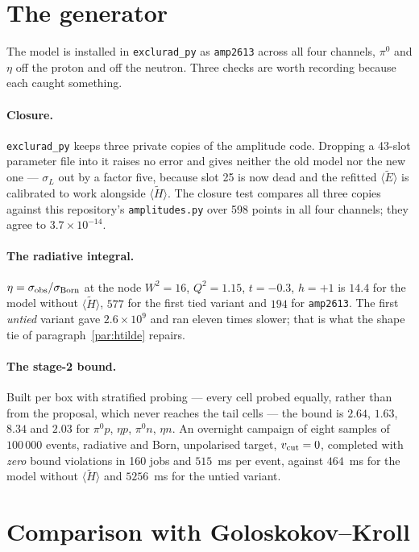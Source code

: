 \documentclass[11pt,a4paper]{article}
\newcommand{\sig}[1]{\sigma_{#1}}
\begin{document}
\section{The generator}

The model is installed in \texttt{exclurad\_py} as \texttt{amp2613} across all
four channels, $\pi^0$ and $\eta$ off the proton and off the neutron.  Three
checks are worth recording because each caught something.

\paragraph{Closure.}  \texttt{exclurad\_py} keeps three private copies of the
amplitude code.  Dropping a 43-slot parameter file into it raises no error and
gives neither the old model nor the new one --- $\sig{L}$ out by a factor five,
because slot 25 is now dead and the refitted $\langle\tilde E\rangle$ is
calibrated to work alongside $\langle\tilde H\rangle$.  The closure test
compares all three copies against this repository's \texttt{amplitudes.py} over
598 points in all four channels; they agree to $3.7\times10^{-14}$.

\paragraph{The radiative integral.}  $\eta = \sigma_{\rm obs}/\sigma_{\rm Born}$
at the node $W^2 = 16$, $Q^2 = 1.15$, $t = -0.3$, $h = +1$ is $14.4$ for the
model without $\langle\tilde H\rangle$, $577$ for the first tied variant and
$194$ for \texttt{amp2613}.  The first \emph{untied} variant gave $2.6\times
10^9$ and ran eleven times slower; that is what the shape tie of
paragraph~\ref{par:htilde} repairs.

\paragraph{The stage-2 bound.}  Built per box with stratified probing --- every
cell probed equally, rather than from the proposal, which never reaches the
tail cells --- the bound is $2.64$, $1.63$, $8.34$ and $2.03$ for
$\pi^0p$, $\eta p$, $\pi^0 n$, $\eta n$.  An overnight campaign of eight
samples of $100\,000$ events, radiative and Born, unpolarised target,
$v_{\rm cut} = 0$, completed with \emph{zero} bound violations in 160 jobs and
$515$~ms per event, against $464$~ms for the model without $\langle\tilde
H\rangle$ and $5256$~ms for the untied variant.

\section{Comparison with Goloskokov--Kroll}
\end{document}
